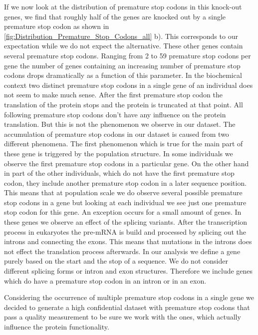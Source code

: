   If we now look at the distribution of premature stop codons in this knock-out genes, we find that roughly half of the genes are knocked out by a single premature stop codon as shown in \autoref{fig:Distribution_Premature_Stop_Codons_all} b). This corresponds to our expectation while we do not expect the alternative.  These other genes contain several premature stop codons. Ranging from 2 to 59 premature stop codons per gene the number of genes containing an increasing number of premature stop codons drops dramatically as a function of this parameter. In the biochemical context two distinct premature stop codons in a single gene of an individual does not seem to make much sense. After the first premature stop codon the translation of the protein stops and the protein is truncated at that point. All following premature stop codons don't have any influence on the protein translation. But this is not the phenomenon we observe in our dataset. The accumulation of premature stop codons in our dataset  is caused from two different phenomena. The first phenomenon which is true for the main part of these gene is triggered by the population structure. In some individuals we observe the first premature stop codons in a particular gene. On the other hand in part of the other individuals, which do not have the first premature stop codon, they include another premature stop codon in a later sequence position. This means that at population scale we do observe several possible premature stop codons in a gene but looking at each individual we see just one premature stop codon for this gene. An exception occurs for a small amount of genes. In these genes we observe an effect of the splicing variants. After the transcription process in eukaryotes the pre-mRNA is build and processed by splicing out the introns and connecting the exons. This means that mutations in the introns does not effect the translation process afterwards. In our analysis we define a gene purely based on the start and the stop of a sequence. We do not consider different splicing forms or intron and exon structures. Therefore we include genes which do have a premature stop codon in an intron or in an exon. 
  
  Considering the occurrence of multiple premature stop codons in a single gene we decided to generate a high confidential dataset with premature stop codons that pass a quality measurement to be sure we work with the ones, which actually influence the protein functionality.
